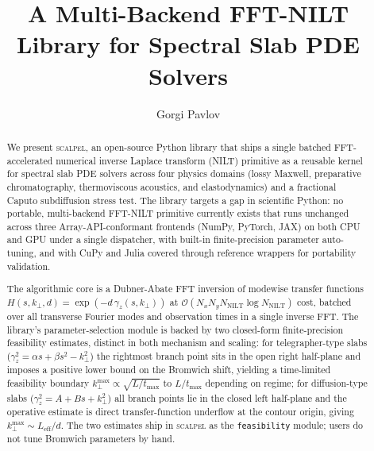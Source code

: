 \documentclass[manuscript,review]{acmart}
\newcommand{\kperp}{k_\perp}
\newcommand{\kpmax}[1][]{k_\perp^{\max#1}}
\newcommand{\gammaz}{\gamma_z}
\newcommand{\scalpel}{\textsc{scalpel}}
\begin{document}
\title[A multi-backend FFT-NILT library for spectral slab PDE solvers]{%
A Multi-Backend FFT-NILT Library for Spectral Slab PDE Solvers}

\author{Gorgi Pavlov}

\begin{abstract}
We present \scalpel, an open-source Python library that ships a single
batched FFT-accelerated numerical inverse Laplace transform (NILT)
primitive as a reusable kernel for spectral slab PDE solvers across
four physics domains (lossy Maxwell, preparative chromatography,
thermoviscous acoustics, and elastodynamics) and a fractional Caputo
subdiffusion stress test. The library targets a gap in scientific
Python: no portable, multi-backend FFT-NILT primitive currently
exists that runs unchanged across three Array-API-conformant
frontends (NumPy, PyTorch, JAX) on both CPU and GPU under a single
dispatcher, with built-in finite-precision parameter auto-tuning,
and with CuPy and Julia covered through reference wrappers for
portability validation.

The algorithmic core is a Dubner-Abate FFT inversion of modewise
transfer functions $H(s, \kperp, d) = \exp(-d\,\gammaz(s, \kperp))$ at
$\mathcal{O}(N_x N_y N_{\mathrm{NILT}} \log N_{\mathrm{NILT}})$ cost,
batched over all transverse Fourier modes and observation times in a
single inverse FFT. The library's parameter-selection module is
backed by two closed-form finite-precision feasibility estimates,
distinct in both mechanism and scaling: for telegrapher-type slabs
($\gammaz^2 = \alpha s + \beta s^2 - \kperp^2$) the rightmost branch
point sits in the open right half-plane and imposes a positive lower
bound on the Bromwich shift, yielding a time-limited feasibility
boundary $\kpmax \propto \sqrt{L/t_{\max}}$ to $L/t_{\max}$ depending
on regime; for diffusion-type slabs ($\gammaz^2 = A + Bs + \kperp^2$)
all branch points lie in the closed left half-plane and the operative
estimate is direct transfer-function underflow at the contour origin,
giving $\kpmax \sim L_{\mathrm{eff}}/d$. The two estimates ship in
\scalpel{} as the \texttt{feasibility} module; users do not tune
Bromwich parameters by hand.


\end{abstract}
\end{document}
